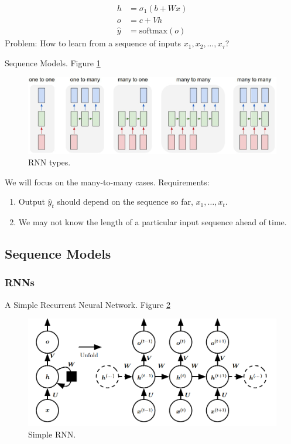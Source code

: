 \documentclass[english]{article}
\begin{document}
\begin{align*}
h &= \sigma_1(b+Wx)\\
o &= c+Vh\\
\hat{y} &= \text{softmax}(o)
\end{align*}
Problem: How to learn from a sequence of inputs $x_1, x_2,\dots,x_\tau$?

 

\item 
 {Sequence Models}.  Figure \ref{rnn-types}

\begin{figure}
  \centering
\includegraphics[width=0.9\linewidth]{rnn-types.png}
    \caption{RNN types.}
    \label{rnn-types}
\end{figure}
We will focus on the many-to-many cases. Requirements:
\begin{enumerate}
\item Output $\hat{y}_t$ should depend on the sequence so far, $x_1,\dots,x_t$.
\item We may not know the length of a particular input sequence ahead of time.
\end{enumerate}
\eenum

\subsection{Sequence Models}
\subsubsection{RNNs} %
\benum
\item 
 {A Simple Recurrent Neural Network}.  Figure \ref{Simple RNN}

\begin{figure}
  \centering
\includegraphics[width=0.8\linewidth]{rnn.png}
    \caption{Simple RNN.}
    \label{Simple RNN}
\end{figure}
\end{document}
